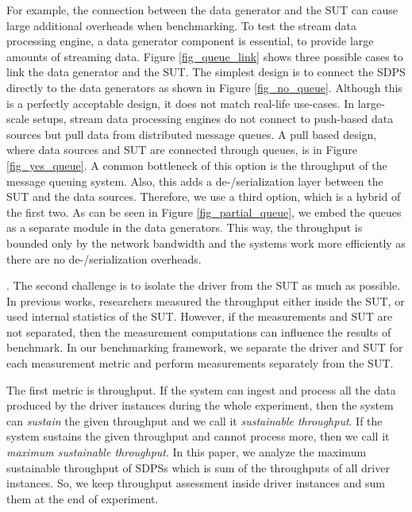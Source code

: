 For example, the connection between the data generator and the SUT can cause large additional overheads when benchmarking.  To test the stream data processing engine, a data generator component is essential, to provide large amounts of streaming data. Figure \ref{fig_queue_link} shows  three possible cases to link the data generator and the SUT. The simplest design is to connect the SDPS directly to the data generators as shown in Figure \ref{fig_no_queue}. Although this is a perfectly acceptable design, it does not match real-life use-cases. In large-scale setups, stream data processing engines do not connect to push-based data sources but pull data from distributed message queues. A pull based design, where data sources and SUT are connected through queues, is in Figure \ref{fig_yes_queue}. A common bottleneck of this option is the throughput of the message queuing system. Also, this adds  a de-/serialization layer between the SUT and the data sources. Therefore, we use a third option, which is a hybrid of the first two. As can be seen in Figure \ref{fig_partial_queue}, we embed the queues as a separate module in the data generators. This way, the throughput is bounded only by the network bandwidth and the systems work more efficiently as there are no de-/serialization overheads.%


. The second challenge is to isolate the  driver from the SUT as much as possible. In previous works, researchers measured the throughput  either  inside the SUT, or used internal statistics of the SUT. %
However, if the measurements and SUT are not separated, then the measurement computations can influence the results of benchmark.
In our benchmarking framework, we separate the driver and SUT for each measurement metric and perform measurements separately from the SUT. 


The first metric is throughput. 
If the system can ingest and process all the data produced by the driver instances during the whole experiment, then the system can \textit{sustain} the given throughput and we call it \textit{sustainable throughput}. If the system sustains the given throughput and cannot process more, then we call it \textit{maximum sustainable throughput}. In this paper, we analyze the maximum sustainable throughput of SDPSs which is  sum of the throughputs of all driver instances. So, we keep throughput assessment inside driver instances and sum them at the end of experiment. 

